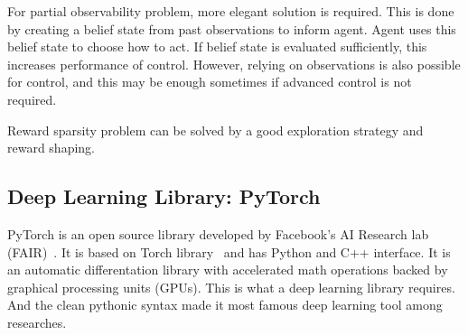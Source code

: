 For partial observability problem, more elegant solution is required. 
This is done by creating a belief state from past observations to inform agent. 
Agent uses this belief state to choose how to act. 
If belief state is evaluated sufficiently, 
this increases performance of control.
However, relying on observations is also possible for control, 
and this may be enough sometimes if advanced control is not required. 

Reward sparsity problem can be solved by a good exploration strategy and reward shaping. 

\subsection{Deep Learning Library: PyTorch}
\label{dl_pytorch}
PyTorch is an open source library developed by Facebook's AI Research lab (FAIR)~\cite{paszke_pytorch_2019}. 
It is based on Torch library~\cite{collobert_torch7_2011} and has Python and C++ interface. 
It is an automatic differentation library with accelerated math operations backed by graphical processing units (GPUs). 
This is what a deep learning library requires. 
And the clean pythonic syntax made it most famous deep learning tool among researches. 
